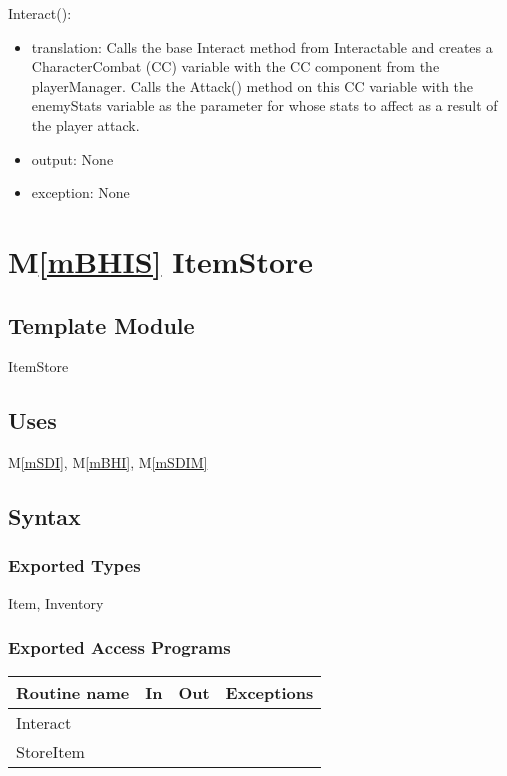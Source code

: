 \documentclass[12pt]{article}
\newcommand{\mref}[1]{M\ref{#1}}
\begin{document}
\noindent Interact():
\begin{itemize}
\item translation: Calls the base Interact method from Interactable and creates a CharacterCombat (CC) variable with the CC component from the playerManager. Calls the Attack() method on this CC variable with the enemyStats variable as the parameter for whose stats to affect as a result of the player attack.
\item output: None
\item exception: None
\end{itemize}

\newpage

\section* {\mref{mBHIS} ItemStore}

\subsection*{Template Module}

ItemStore

\subsection* {Uses}

\mref{mSDI}, \mref{mBHI}, \mref{mSDIM}\\

\subsection* {Syntax}

\subsubsection* {Exported Types}

Item, Inventory

\subsubsection* {Exported Access Programs}

\begin{tabular}{| l | l | l | l |}
\hline
\textbf{Routine name} & \textbf{In} & \textbf{Out} & \textbf{Exceptions}\\
\hline
Interact & ~ & ~  & ~\\
StoreItem & ~ & ~ & ~\\
\hline
\end{tabular}
\end{document}
